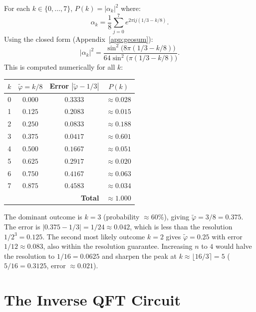 \documentclass[12pt,a4paper]{article}
\newcommand{\ii}{\mathrm{i}}
\begin{document}
For each $k \in \{0,\ldots,7\}$, $P(k) = |\alpha_k|^2$ where:
\[
  \alpha_k = \frac{1}{8}\sum_{j=0}^7 e^{2\pi\ii j(1/3 - k/8)}.
\]
Using the closed form (Appendix~\ref{app:geosum}):
\[
  |\alpha_k|^2 = \frac{\sin^2\!\bigl(8\pi(1/3-k/8)\bigr)}{64\sin^2\!\bigl(\pi(1/3-k/8)\bigr)}.
\]
This is computed numerically for all $k$:

\begin{center}
\begin{tabular}{@{}cccc@{}}
\toprule
$k$ & $\tilde\varphi = k/8$ & Error $|\tilde\varphi - 1/3|$ & $P(k)$ \\
\midrule
0 & $0.000$ & $0.3333$ & $\approx 0.028$ \\
1 & $0.125$ & $0.2083$ & $\approx 0.015$ \\
2 & $0.250$ & $0.0833$ & $\approx 0.188$ \\
3 & $0.375$ & $0.0417$ & $\approx 0.601$ \\
4 & $0.500$ & $0.1667$ & $\approx 0.051$ \\
5 & $0.625$ & $0.2917$ & $\approx 0.020$ \\
6 & $0.750$ & $0.4167$ & $\approx 0.063$ \\
7 & $0.875$ & $0.4583$ & $\approx 0.034$ \\
\midrule
\multicolumn{3}{r}{\textbf{Total}} & $\approx 1.000$ \\
\bottomrule
\end{tabular}
\end{center}

\begin{tcolorbox}[insight]
  The dominant outcome is $k=3$ (probability $\approx 60\%$), giving
  $\tilde\varphi = 3/8 = 0.375$.  The error is $|0.375 - 1/3| = 1/24 \approx 0.042$,
  which is less than the resolution $1/2^3 = 0.125$.
  The second most likely outcome $k=2$ gives $\tilde\varphi = 0.25$ with
  error $1/12 \approx 0.083$, also within the resolution guarantee.
  Increasing $n$ to $4$ would halve the resolution to $1/16 = 0.0625$ and
  sharpen the peak at $k \approx \lfloor 16/3 \rceil = 5$
  ($5/16 = 0.3125$, error $\approx 0.021$).
\end{tcolorbox}

\newpage

\section{The Inverse QFT Circuit}
\label{sec:iqft}
\end{document}

